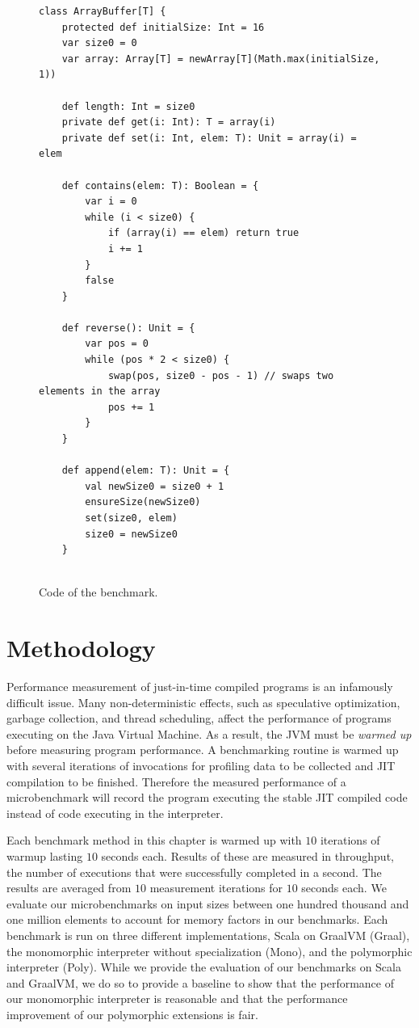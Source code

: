 \begin{figure}[!htb]
\begin{verbatim}
class ArrayBuffer[T] {
	protected def initialSize: Int = 16
	var size0 = 0
	var array: Array[T] = newArray[T](Math.max(initialSize, 1))
	
	def length: Int = size0
	private def get(i: Int): T = array(i)
	private def set(i: Int, elem: T): Unit = array(i) = elem
	
	def contains(elem: T): Boolean = {
		var i = 0
		while (i < size0) {
			if (array(i) == elem) return true
			i += 1
		}
		false
	}
	
	def reverse(): Unit = {
		var pos = 0
		while (pos * 2 < size0) {
			swap(pos, size0 - pos - 1) // swaps two elements in the array
			pos += 1
		}
	}
	
	def append(elem: T): Unit = {
		val newSize0 = size0 + 1
		ensureSize(newSize0)
		set(size0, elem)
		size0 = newSize0
	}
	

\end{verbatim}
\caption{Code of the  benchmark.}
\label{example:arraybuffer-benchmark}
\end{figure}

\section{Methodology}

Performance measurement of just-in-time compiled programs is an infamously difficult issue\cite{java:performance-analysis,java:statistically-rigor-performance-analysis}.
Many non-deterministic effects, such as speculative optimization, garbage collection, and thread scheduling, affect the performance of programs executing on the Java Virtual Machine.
As a result, the JVM must be \textit{warmed up} before measuring program performance.
A benchmarking routine is warmed up with several iterations of invocations for profiling data to be collected and JIT compilation to be finished.
Therefore the measured performance of a microbenchmark will record the program executing the stable JIT compiled code instead of code executing in the interpreter.

Each benchmark method in this chapter is warmed up with $10$ iterations of warmup lasting $10$ seconds each.
Results of these are measured in throughput, the number of executions that were successfully completed in a second.
The results are averaged from $10$ measurement iterations for $10$ seconds each.
We evaluate our microbenchmarks on input sizes between one hundred thousand and one million elements to account for memory factors in our benchmarks. 
Each benchmark is run on three different implementations, Scala on GraalVM (Graal), the monomorphic interpreter without specialization (Mono), and the polymorphic interpreter (Poly).
While we provide the evaluation of our benchmarks on Scala and GraalVM, we do so to provide a baseline to show that the performance of our monomorphic interpreter is reasonable and that the performance improvement of our polymorphic extensions is fair.

